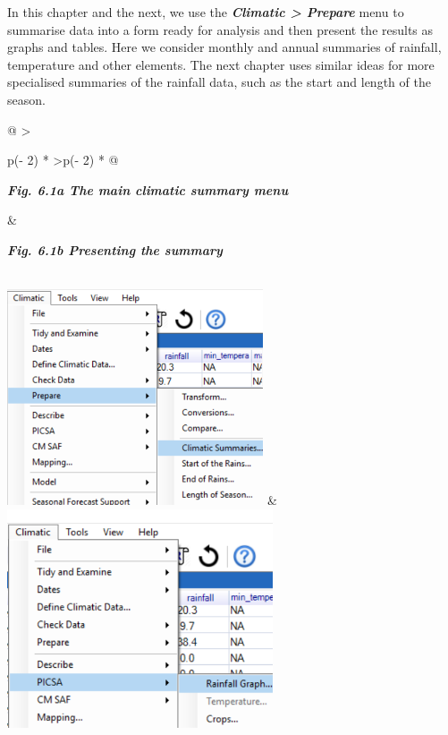 \documentclass[
  letterpaper,
  DIV=11,
  numbers=noendperiod]{scrreprt}
\begin{document}
In this chapter and the next, we use the \textbf{\emph{Climatic
\textgreater{} Prepare}} menu to summarise data into a form ready for
analysis and then present the results as graphs and tables. Here we
consider monthly and annual summaries of rainfall, temperature and other
elements. The next chapter uses similar ideas for more specialised
summaries of the rainfall data, such as the start and length of the
season.

\begin{longtable}[]{@{}
  >{\raggedright\arraybackslash}p{(\columnwidth - 2\tabcolsep) * }
  >{\centering\arraybackslash}p{(\columnwidth - 2\tabcolsep) * }@{}}
\toprule\noalign{}
\begin{minipage}[b]{\linewidth}\raggedright
\textbf{\emph{Fig. 6.1a The main climatic summary menu}}
\end{minipage} & \begin{minipage}[b]{\linewidth}\centering
\textbf{\emph{Fig. 6.1b Presenting the summary}}
\end{minipage} \\
\midrule\noalign{}
\endhead
\bottomrule\noalign{}
\endlastfoot
\includegraphics[width=2.983in,height=2.51056in]{figures/Fig6.1a.png} &
\includegraphics[width=3.09296in,height=2.54131in]{figures/Fig6.1b.png} \\
\end{longtable}
\end{document}
